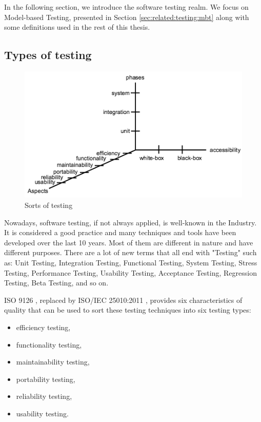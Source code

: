 
In the following section, we introduce the software testing
realm. We focus on Model-based Testing, presented in Section
\ref{sec:related:testing:mbt} along with some definitions used
in the rest of this thesis.

\subsection{Types of testing}

\begin{figure}[ht]
    \begin{center}
    \includegraphics[width=1.0\linewidth]{figures/sorts-of-testing.png}
    \end{center}

    \caption{Sorts of testing}
\end{figure}


Nowadays, software testing, if not always applied, is well-known
in the Industry. It is considered a good practice and many
techniques and tools have been developed over the last 10 years.
Most of them are different in nature and have different purposes.
There are a lot of new terms that all end with "Testing" such as:
Unit Testing, Integration Testing, Functional Testing, System
Testing, Stress Testing, Performance Testing, Usability Testing,
Acceptance Testing, Regression Testing, Beta Testing, and so on.

ISO 9126 \cite{iso9126}, replaced by ISO/IEC 25010:2011
\cite{10951538}, provides six characteristics of quality that can
be used to sort these testing techniques into six testing types:

\begin{itemize}
\item efficiency testing,
\item functionality testing,
\item maintainability testing,
\item portability testing,
\item reliability testing,
\item usability testing.
\end{itemize}

